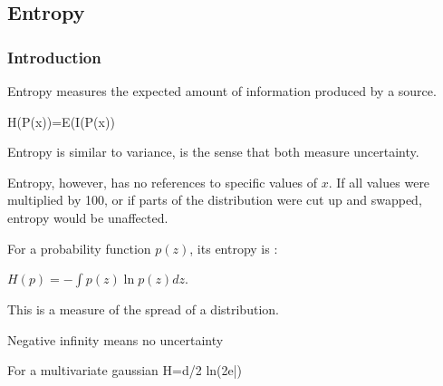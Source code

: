 
\subsection{Entropy}

\subsubsection{Introduction}

Entropy measures the expected amount of information produced by a source.

H(P(x))=E(I(P(x))

Entropy is similar to variance, is the sense that both measure uncertainty.

Entropy, however, has no references to specific values of \(x\). If all values were multiplied by 100, or if parts of the distribution were cut up and swapped, entropy would be unaffected.

For a probability function \(p(z)\), its entropy is :

\(H(p)=-\int p(z)\ln p(z)dz\).

This is a measure of the spread of a distribution.

Negative infinity means no uncertainty

For a multivariate gaussian H=d/2 ln(2\pi e|\Sigma)

